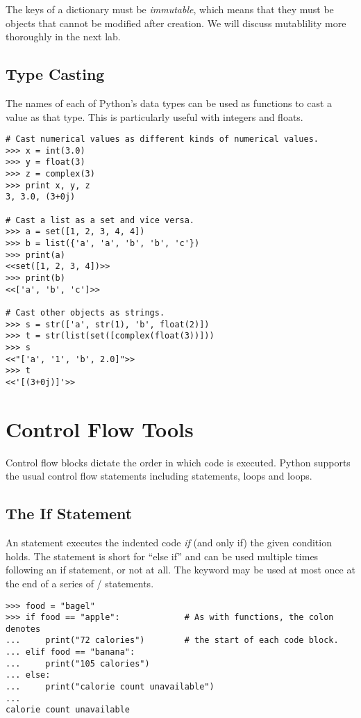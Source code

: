 The keys of a dictionary must be \emph{immutable}, which means that they must be objects that cannot be modified after creation.
We will discuss mutablility more thoroughly in the next lab.

\subsection*{Type Casting} %

The names of each of Python's data types can be used as functions to cast a value as that type.
This is particularly useful with integers and floats.

\begin{lstlisting}
# Cast numerical values as different kinds of numerical values.
>>> x = int(3.0)
>>> y = float(3)
>>> z = complex(3)
>>> print x, y, z
3, 3.0, (3+0j)

# Cast a list as a set and vice versa.
>>> a = set([1, 2, 3, 4, 4])
>>> b = list({'a', 'a', 'b', 'b', 'c'})
>>> print(a)
<<set([1, 2, 3, 4])>>
>>> print(b)
<<['a', 'b', 'c']>>

# Cast other objects as strings.
>>> s = str(['a', str(1), 'b', float(2)])
>>> t = str(list(set([complex(float(3))]))
>>> s
<<"['a', '1', 'b', 2.0]">>
>>> t
<<'[(3+0j)]'>>

\end{lstlisting}

\section*{Control Flow Tools} %
Control flow blocks dictate the order in which code is executed.
Python supports the usual control flow statements including  statements,  loops and  loops.

\subsection*{The If Statement} %

An  statement executes the indented code \emph{if} (and only if) the given condition holds.
The  statement is short for ``else if'' and can be used multiple times following an if statement, or not at all. 
The  keyword may be used at most once at the end of a series of / statements.
\begin{lstlisting}
>>> food = "bagel"         
>>> if food == "apple":             # As with functions, the colon denotes
...     print("72 calories")        # the start of each code block.
... elif food == "banana":
...     print("105 calories")
... else: 
...     print("calorie count unavailable")
...     
calorie count unavailable
\end{lstlisting}


